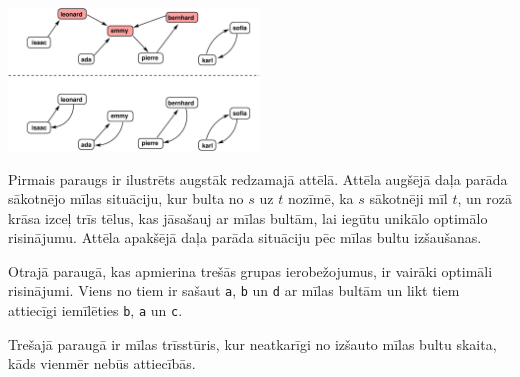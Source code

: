 \section*{\sampleexplanations}

\begin{center}
\includegraphics[width=0.5\textwidth]{polygonfig.pdf}
\end{center}

Pirmais paraugs ir ilustrēts augstāk redzamajā attēlā. Attēla augšējā daļa parāda sākotnējo mīlas situāciju,
kur bulta no $s$ uz $t$ nozīmē, ka $s$ sākotnēji mīl $t$, un rozā krāsa izceļ trīs tēlus,
kas jāsašauj ar mīlas bultām, lai iegūtu unikālo optimālo risinājumu. Attēla apakšējā daļa parāda situāciju pēc mīlas bultu izšaušanas.

Otrajā paraugā, kas apmierina trešās grupas ierobežojumus, ir vairāki optimāli risinājumi.
Viens no tiem ir sašaut \texttt{a}, \texttt{b} un \texttt{d} ar mīlas bultām un likt tiem attiecīgi iemīlēties \texttt{b}, \texttt{a} un \texttt{c}.

Trešajā paraugā ir mīlas trīsstūris, kur neatkarīgi no izšauto mīlas bultu skaita, kāds vienmēr nebūs attiecībās.

